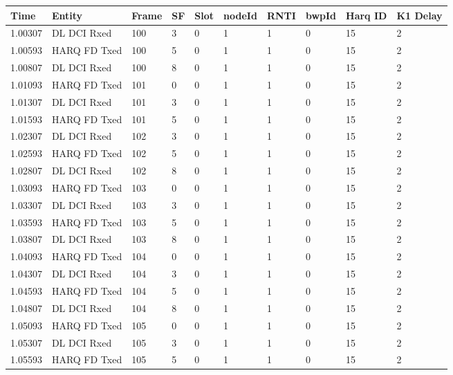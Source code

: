 \documentclass[12pt,a4paper]{article}
\begin{document}
\begin{table}[!ht]
    \centering
    \begin{tabular}{|l|l|l|l|l|l|l|l|l|l|}
    \hline
        Time & Entity & Frame & SF & Slot & nodeId & RNTI & bwpId & Harq ID & K1 Delay \\ \hline
        1.00307 & DL DCI Rxed & 100 & 3 & 0 & 1 & 1 & 0 & 15 & 2 \\ \hline
        1.00593 & HARQ FD Txed & 100 & 5 & 0 & 1 & 1 & 0 & 15 & 2 \\ \hline
        1.00807 & DL DCI Rxed & 100 & 8 & 0 & 1 & 1 & 0 & 15 & 2 \\ \hline
        1.01093 & HARQ FD Txed & 101 & 0 & 0 & 1 & 1 & 0 & 15 & 2 \\ \hline
        1.01307 & DL DCI Rxed & 101 & 3 & 0 & 1 & 1 & 0 & 15 & 2 \\ \hline
        1.01593 & HARQ FD Txed & 101 & 5 & 0 & 1 & 1 & 0 & 15 & 2 \\ \hline
        1.02307 & DL DCI Rxed & 102 & 3 & 0 & 1 & 1 & 0 & 15 & 2 \\ \hline
        1.02593 & HARQ FD Txed & 102 & 5 & 0 & 1 & 1 & 0 & 15 & 2 \\ \hline
        1.02807 & DL DCI Rxed & 102 & 8 & 0 & 1 & 1 & 0 & 15 & 2 \\ \hline
        1.03093 & HARQ FD Txed & 103 & 0 & 0 & 1 & 1 & 0 & 15 & 2 \\ \hline
        1.03307 & DL DCI Rxed & 103 & 3 & 0 & 1 & 1 & 0 & 15 & 2 \\ \hline
        1.03593 & HARQ FD Txed & 103 & 5 & 0 & 1 & 1 & 0 & 15 & 2 \\ \hline
        1.03807 & DL DCI Rxed & 103 & 8 & 0 & 1 & 1 & 0 & 15 & 2 \\ \hline
        1.04093 & HARQ FD Txed & 104 & 0 & 0 & 1 & 1 & 0 & 15 & 2 \\ \hline
        1.04307 & DL DCI Rxed & 104 & 3 & 0 & 1 & 1 & 0 & 15 & 2 \\ \hline
        1.04593 & HARQ FD Txed & 104 & 5 & 0 & 1 & 1 & 0 & 15 & 2 \\ \hline
        1.04807 & DL DCI Rxed & 104 & 8 & 0 & 1 & 1 & 0 & 15 & 2 \\ \hline
        1.05093 & HARQ FD Txed & 105 & 0 & 0 & 1 & 1 & 0 & 15 & 2 \\ \hline
        1.05307 & DL DCI Rxed & 105 & 3 & 0 & 1 & 1 & 0 & 15 & 2 \\ \hline
        1.05593 & HARQ FD Txed & 105 & 5 & 0 & 1 & 1 & 0 & 15 & 2 \\ \hline

\end{tabular}
\end{table}
\end{document}
